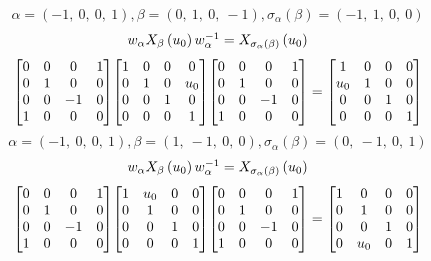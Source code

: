 \documentclass[11pt]{article}
\theoremstyle{definition}
\begin{document}
\[
\alpha = \left( -1, \  0, \  0, \  1\right), \beta = \left( 0, \  1, \  0, \  -1\right), \sigma_{\alpha}(\beta) = \left( -1, \  1, \  0, \  0\right)
\]
\[
\scaletoalign{\textwidth}{w_{\alpha} X_{\beta}\left(u_{0}\right) w_{\alpha}^{-1} = X_{\sigma_{\alpha}\left(\beta\right)}\left(u_{0}\right)}
\]
\[
\scaletoalign{\textwidth}{{\left[\begin{matrix}0 & 0 & 0 & 1\\0 & 1 & 0 & 0\\0 & 0 & -1 & 0\\1 & 0 & 0 & 0\end{matrix}\right]} {\left[\begin{matrix}1 & 0 & 0 & 0\\0 & 1 & 0 & u_{0}\\0 & 0 & 1 & 0\\0 & 0 & 0 & 1\end{matrix}\right]} {\left[\begin{matrix}0 & 0 & 0 & 1\\0 & 1 & 0 & 0\\0 & 0 & -1 & 0\\1 & 0 & 0 & 0\end{matrix}\right]} = {\left[\begin{matrix}1 & 0 & 0 & 0\\u_{0} & 1 & 0 & 0\\0 & 0 & 1 & 0\\0 & 0 & 0 & 1\end{matrix}\right]}}
\]
\[
\alpha = \left( -1, \  0, \  0, \  1\right), \beta = \left( 1, \  -1, \  0, \  0\right), \sigma_{\alpha}(\beta) = \left( 0, \  -1, \  0, \  1\right)
\]
\[
\scaletoalign{\textwidth}{w_{\alpha} X_{\beta}\left(u_{0}\right) w_{\alpha}^{-1} = X_{\sigma_{\alpha}\left(\beta\right)}\left(u_{0}\right)}
\]
\[
\scaletoalign{\textwidth}{{\left[\begin{matrix}0 & 0 & 0 & 1\\0 & 1 & 0 & 0\\0 & 0 & -1 & 0\\1 & 0 & 0 & 0\end{matrix}\right]} {\left[\begin{matrix}1 & u_{0} & 0 & 0\\0 & 1 & 0 & 0\\0 & 0 & 1 & 0\\0 & 0 & 0 & 1\end{matrix}\right]} {\left[\begin{matrix}0 & 0 & 0 & 1\\0 & 1 & 0 & 0\\0 & 0 & -1 & 0\\1 & 0 & 0 & 0\end{matrix}\right]} = {\left[\begin{matrix}1 & 0 & 0 & 0\\0 & 1 & 0 & 0\\0 & 0 & 1 & 0\\0 & u_{0} & 0 & 1\end{matrix}\right]}}
\]
\end{document}
